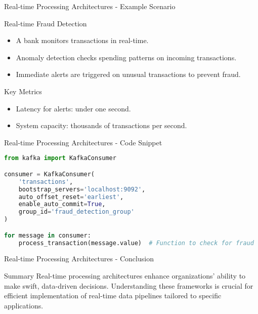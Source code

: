 \documentclass[aspectratio=169]{beamer}
\begin{document}
\begin{frame}[fragile]{Real-time Processing Architectures - Example Scenario}
    \begin{block}{Real-time Fraud Detection}
        \begin{itemize}
            \item A bank monitors transactions in real-time.
            \item Anomaly detection checks spending patterns on incoming transactions.
            \item Immediate alerts are triggered on unusual transactions to prevent fraud.
        \end{itemize}
    \end{block}
    \begin{block}{Key Metrics}
        \begin{itemize}
            \item Latency for alerts: under one second.
            \item System capacity: thousands of transactions per second.
        \end{itemize}
    \end{block}
\end{frame}

\begin{frame}[fragile]{Real-time Processing Architectures - Code Snippet}
    \begin{lstlisting}[language=Python, caption=Stream Processing Using Kafka]
from kafka import KafkaConsumer

consumer = KafkaConsumer(
    'transactions',
    bootstrap_servers='localhost:9092',
    auto_offset_reset='earliest',
    enable_auto_commit=True,
    group_id='fraud_detection_group'
)

for message in consumer:
    process_transaction(message.value)  # Function to check for fraud
    \end{lstlisting}
\end{frame}

\begin{frame}[fragile]{Real-time Processing Architectures - Conclusion}
    \begin{block}{Summary}
        Real-time processing architectures enhance organizations' ability to make swift, data-driven decisions. 
        Understanding these frameworks is crucial for efficient implementation of real-time data pipelines tailored to specific applications.
    \end{block}
\end{frame}
\end{document}

